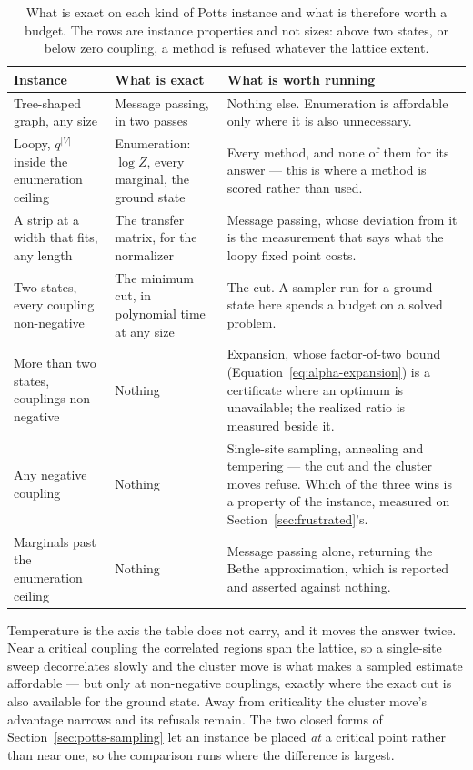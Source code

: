 \documentclass[11pt,a4paper]{article}
\begin{document}
\begin{table}[htbp]
  \centering
  \footnotesize
  \begin{tabular}{@{}p{}p{}p{}@{}}
    \toprule
    Instance & What is exact & What is worth running \\
    \midrule
    Tree-shaped graph, any size
      & Message passing, in two passes
      & Nothing else. Enumeration is affordable only where it is also
        unnecessary. \\
    Loopy, $q^{|V|}$ inside the enumeration ceiling
      & Enumeration: $\log Z$, every marginal, the ground state
      & Every method, and none of them for its answer --- this is where a
        method is scored rather than used. \\
    A strip at a width that fits, any length
      & The transfer matrix, for the normalizer
      & Message passing, whose deviation from it is the measurement that
        says what the loopy fixed point costs. \\
    Two states, every coupling non-negative
      & The minimum cut, in polynomial time at any size
      & The cut. A sampler run for a ground state here spends a budget on a
        solved problem. \\
    More than two states, couplings non-negative
      & Nothing
      & Expansion, whose factor-of-two bound
        (Equation~\ref{eq:alpha-expansion}) is a certificate where an
        optimum is unavailable; the realized ratio is measured beside it. \\
    Any negative coupling
      & Nothing
      & Single-site sampling, annealing and tempering --- the cut and the
        cluster moves refuse. Which of the three wins is a property of the
        instance, measured on Section~\ref{sec:frustrated}'s. \\
    Marginals past the enumeration ceiling
      & Nothing
      & Message passing alone, returning the Bethe approximation, which is
        reported and asserted against nothing. \\
    \bottomrule
  \end{tabular}
  \caption{What is exact on each kind of Potts instance and what is
  therefore worth a budget. The rows are instance properties and not sizes:
  above two states, or below zero coupling, a method is refused whatever the
  lattice extent.}
  \label{tab:potts:regimes}
\end{table}

Temperature is the axis the table does not carry, and it moves the answer
twice. Near a critical coupling the correlated regions span the lattice, so a
single-site sweep decorrelates slowly and the cluster move is what makes a
sampled estimate affordable --- but only at non-negative couplings, exactly
where the exact cut is also available for the ground state. Away from
criticality the cluster move's advantage narrows and its refusals remain. The
two closed forms of Section~\ref{sec:potts-sampling} let an instance be placed
\emph{at} a critical point rather than near one, so the comparison runs where
the difference is largest.
\end{document}

